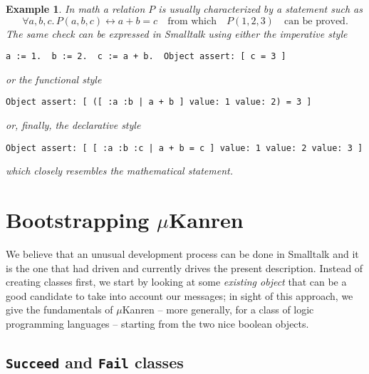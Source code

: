 \documentclass[a4paper,12pt]{article}
\newtheorem{example}[theorem]{Example}
\begin{document}
\begin{example}
In math a relation $P$ is usually characterized by a statement such as
\begin{displaymath}
\forall a,b,c.\,P(a,b,c) \leftrightarrow a + b = c \quad\text{from which}\quad
P(1,2,3) \quad\text{can be proved.}
\end{displaymath}
The same check can be expressed in Smalltalk using either the
\textit{imperative style}
\begin{verbatim}
a := 1.  b := 2.  c := a + b.  Object assert: [ c = 3 ]
\end{verbatim}
or the \textit{functional style}
\begin{verbatim}
Object assert: [ ([ :a :b | a + b ] value: 1 value: 2) = 3 ]
\end{verbatim}
or, finally, the \textit{declarative style}
\begin{verbatim}
Object assert: [ [ :a :b :c | a + b = c ] value: 1 value: 2 value: 3 ]
\end{verbatim}
which closely resembles the mathematical statement.
\end{example}

\tableofcontents

\section{Bootstrapping $\mu$Kanren}

We believe that an unusual development process can be done in Smalltalk and it
is the one that had driven and currently drives the present description.
Instead of creating classes first, we start by looking at some \textit{existing
object} that can be a good candidate to take into account our messages; in
sight of this approach, we give the fundamentals of $\mu$Kanren -- more
generally, for a class of logic programming languages -- starting from the two
nice boolean objects. 
    
\subsection{\texttt{Succeed} and \texttt{Fail} classes}    
\end{document}
